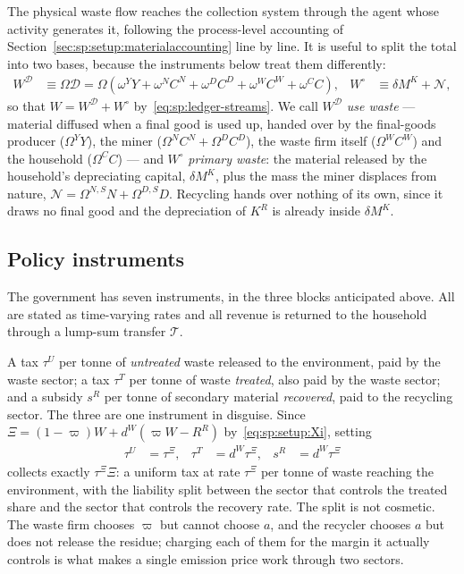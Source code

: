  The physical waste flow reaches the collection system through the
agent whose activity generates it, following the process-level accounting of
Section~\ref{sec:sp:setup:materialaccounting} line by line. It is useful to split the total into two
bases, because the instruments below treat them differently:
\begin{align}
W^{\mathcal D} &\equiv \Omega\mathcal D
= \Omega\left(\omega^YY+\omega^NC^N+\omega^DC^D+\omega^WC^W+\omega^CC\right),
&
W^{\circ} &\equiv \delta M^K+\mathcal N,
\label{eq:mkt:bases}
\end{align}
so that $W=W^{\mathcal D}+W^{\circ}$ by~\eqref{eq:sp:ledger-streams}. We call $W^{\mathcal D}$
\emph{use waste} --- material diffused when a final good is used up, handed over by the final-goods
producer ($\Omega^YY$), the miner ($\Omega^NC^N+\Omega^DC^D$), the waste firm itself ($\Omega^WC^W$)
and the household ($\Omega^CC$) --- and $W^{\circ}$ \emph{primary waste}: the material released by the
household's depreciating capital, $\delta M^K$, plus the mass the miner displaces from nature,
$\mathcal N=\Omega^{N,S}N+\Omega^{D,S}D$. Recycling hands over nothing of its own, since it draws no
final good and the depreciation of $K^R$ is already inside $\delta M^K$.

\subsection{Policy instruments}\label{sec:mkt:setup:instruments}

The government has seven instruments, in the three blocks anticipated above. All are stated as
time-varying rates and all revenue is returned to the household through a lump-sum transfer $\mathcal T$.

 A tax $\tau^U$ per tonne of \emph{untreated} waste released to the
environment, paid by the waste sector; a tax $\tau^T$ per tonne of waste \emph{treated}, also paid by
the waste sector; and a subsidy $s^R$ per tonne of secondary material \emph{recovered}, paid to the
recycling sector. The three are one instrument in disguise. Since
$\Xi=\left(1-\varpi\right)W+d^W\left(\varpi W-R^R\right)$ by~\eqref{eq:sp:setup:Xi}, setting
\begin{align}
\tau^U &= \tau^\Xi,
&
\tau^T &= d^W\tau^\Xi,
&
s^R &= d^W\tau^\Xi
\label{eq:mkt:emission-split}
\end{align}
collects exactly $\tau^\Xi\Xi$: a uniform tax at rate $\tau^\Xi$ per tonne of waste reaching the
environment, with the liability split between the sector that controls the treated share and the
sector that controls the recovery rate. The split is not cosmetic. The waste firm chooses $\varpi$ but
cannot choose $a$, and the recycler chooses $a$ but does not release the residue; charging each of them
for the margin it actually controls is what makes a single emission price work through two sectors.

